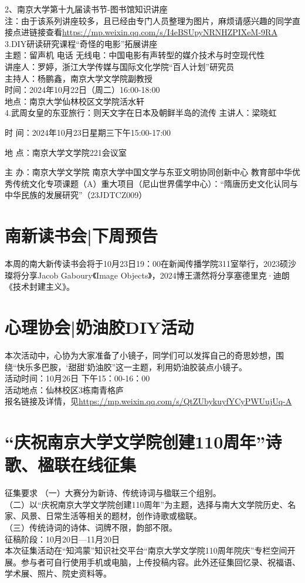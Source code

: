 \documentclass[letterpaper, 12pt]{article}
\begin{document}
\begin{multicols}{2}
2、南京大学第十九届读书节-图书馆知识讲座\\
注：由于该系列讲座较多，且已经由专门人员整理为图片，麻烦请感兴趣的同学直接点进链接查看\url{https://mp.weixin.qq.com/s/I4eBSUpyNRNHZPIXeM-9RA}\\

3.DIY研读研究课程“奇怪的电影”拓展讲座\\
主题：留声机 电话 无线电：中国电影有声转型的媒介技术与时空现代性\\
讲座人：罗婷，浙江大学传媒与国际文化学院“百人计划”研究员\\
主持人：杨鹏鑫，南京大学文学院副教授\\
时间：2024年10月22日（周二）16:00-18:00\\
地点：南京大学仙林校区文学院活水轩\\

4.武周女皇的东亚旅行：则天文字在日本及朝鲜半岛的流传
主讲人：梁晓虹

时  间：2024年10月23日星期三下午15:00-17:00

地  点：南京大学文学院221会议室

主  办：南京大学文学院 南京大学中国文学与东亚文明协同创新中心 教育部中华优秀传统文化专项课题（A）重大项目（尼山世界儒学中心）：“隋唐历史文化认同与中华民族的发展研究”（23JDTCZ009）

\section{南新读书会|下周预告}
本周的南大新传读书会将于10月23日19：00在新闻传播学院311室举行，2023硕沙璨将分享Jacob Gaboury《Image Objects》，2024博王潇然将分享塞德里克·迪朗《技术封建主义》。\\
\section{心理协会|奶油胶DIY活动}
本次活动中，心协为大家准备了小镜子，同学们可以发挥自己的奇思妙想，围绕“快乐多巴胺，‘甜甜’奶油胶”这一主题，利用奶油胶装点小镜子。\\
活动时间：10月26日 下午15：00-16：00\\
活动地点：仙林校区3栋南青格庐\\
报名链接及详情，见\url{https://mp.weixin.qq.com/s/QtZUbykuyfYCyPWUujUq-A}\\
\section{“庆祝南京大学文学院创建110周年”诗歌、楹联在线征集}
征集要求
（一）大赛分为新诗、传统诗词与楹联三个组别。\\
（二）以“庆祝南京大学文学院创建110周年”为主题，选择与南大文学院历史、名家、风景、日常生活等相关的题材，创作诗歌或楹联。\\
（三）传统诗词的诗体、词牌不限，韵部不限。\\
征稿阶段：10月20日—11月20日\\
本次征集活动在“知鸿蒙”知识社交平台“南京大学文学院110周年院庆”专栏空间开展。参与者可自行使用手机或电脑，上传投稿内容。此外还征集回忆录、祝福语、学术展、照片、院史资料等。

\end{multicols}
\end{document}
